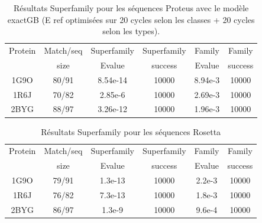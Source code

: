   \clearpage
\begin{table}[h]
  \raggedleft{}
  
  \begin{tabular}{cccccc}
    
    \toprule
    Protein & Match/seq & Superfamily & Superfamily & Family & Family \\
            & size      & Evalue      & success     & Evalue & success\\
    \cmidrule{1-6}
    1G9O  & 80/91 &  8.54e-14  & 10000  & 8.94e-3 & 10000  \\
    1R6J  & 70/82 &  2.85e-6   & 10000  & 2.69e-3 & 10000  \\
    2BYG  & 88/97 &  3.26e-12  & 10000  & 1.96e-3 & 10000  \\

    \bottomrule        
  \end{tabular}   
  \caption{Résultats Superfamily pour les séquences Proteus avec le modèle exactGB (E ref optimisées sur 20 cycles selon les classes + 20 cycles selon les types).}   
  \label{tab:superfamily_model_B6}       
\end{table}

\begin{table}[h]
  \begin{tabular}{cccccc}
    
    \toprule
    Protein & Match/seq & Superfamily & Superfamily & Family & Family \\
            & size      & Evalue      & success     & Evalue & success\\
    \cmidrule{1-6}
    1G9O  & 79/91   &    1.3e-13 & 10000 & 2.2e-3 & 10000 \\
    1R6J  & 76/82   &    7.3e-13 & 10000 & 1.8e-3 & 10000 \\
    2BYG  & 86/97   &    1.3e-9  & 10000 & 9.6e-4 & 10000 \\

    \bottomrule        
  \end{tabular}   
  \caption{Résultats Superfamily pour les séquences Rosetta }   
  \label{tab:superfamily_model_B6}       
\end{table}

